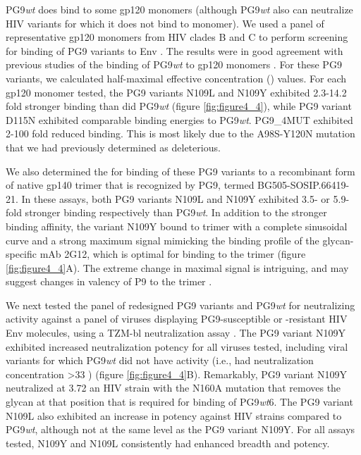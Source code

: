 PG9\textit{wt} does bind to some gp120 monomers (although PG9\textit{wt} also can neutralize HIV variants for which it does not bind to monomer). We used a panel of representative gp120 monomers from HIV clades B and C to perform screening for binding of PG9 variants to Env \citep{Li:2006kv,Li:2005go}. The results were in good agreement with previous studies of the binding of PG9\textit{wt} to gp120 monomers \citep{McLellan:2011dg}. For these PG9 variants, we calculated half-maximal effective concentration (\ec) values. For each gp120 monomer tested, the PG9 variants N109L and N109Y exhibited 2.3-14.2 fold stronger binding than did PG9\textit{wt} (figure \ref{fig:figure4_4}), while PG9 variant D115N exhibited comparable binding energies to PG9\textit{wt}. PG9\_4MUT exhibited 2-100 fold reduced binding. This is most likely due to the A98S-Y120N mutation that we had previously determined as deleterious.

We also determined the \ec for binding of these PG9 variants to a recombinant form of native gp140 trimer that is recognized by PG9, termed BG505-SOSIP.66419-21. In these assays, both PG9 variants N109L and N109Y exhibited 3.5- or 5.9-fold stronger binding respectively than PG9\textit{wt}. In addition to the stronger binding affinity, the variant N109Y bound to trimer with a complete sinusoidal curve and a strong maximum signal mimicking the binding profile of the glycan-specific mAb 2G12, which is optimal for binding to the trimer \citep{Sanders:2013gm}  (figure \ref{fig:figure4_4}A). The extreme change in maximal signal is intriguing, and may suggest changes in valency of P9 to the trimer \citep{Julien:2013jp}.

We next tested the panel of redesigned PG9 variants and PG9\textit{wt} for neutralizing activity against a panel of viruses displaying PG9-susceptible or -resistant HIV Env molecules, using a TZM-bl neutralization assay \citep{Montefiori:2009hj}. The PG9 variant N109Y exhibited increased neutralization potency for all viruses tested, including viral variants for which PG9\textit{wt} did not have activity (i.e., had neutralization concentration >33 \mcml) (figure \ref{fig:figure4_4}B). Remarkably, PG9 variant N109Y neutralized at 3.72 \mcml an HIV strain with the N160A mutation that removes the glycan at that position that is required for binding of PG9\textit{wt}6. The PG9 variant N109L also exhibited an increase in potency against HIV strains compared to PG9\textit{wt}, although not at the same level as the PG9 variant N109Y. For all assays tested, N109Y and N109L consistently had enhanced breadth and potency.


